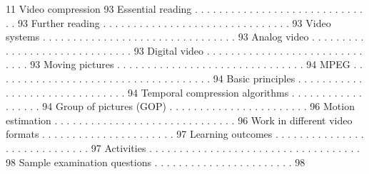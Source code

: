 11 Video compression 93
Essential reading . . . . . . . . . . . . . . . . . . . . . . . . . . . . . . 93
Further reading . . . . . . . . . . . . . . . . . . . . . . . . . . . . . . . 93
Video systems . . . . . . . . . . . . . . . . . . . . . . . . . . . . . . . . 93
Analog video . . . . . . . . . . . . . . . . . . . . . . . . . . . . . . 93
Digital video . . . . . . . . . . . . . . . . . . . . . . . . . . . . . . 93
Moving pictures . . . . . . . . . . . . . . . . . . . . . . . . . . . . . . . 94
MPEG . . . . . . . . . . . . . . . . . . . . . . . . . . . . . . . . . . . . 94
Basic principles . . . . . . . . . . . . . . . . . . . . . . . . . . . . . . . 94
Temporal compression algorithms . . . . . . . . . . . . . . . . . . 94
Group of pictures (GOP) . . . . . . . . . . . . . . . . . . . . . . . 96
Motion estimation . . . . . . . . . . . . . . . . . . . . . . . . . . . . . . 96
Work in different video formats . . . . . . . . . . . . . . . . . . . . . . 97
Learning outcomes . . . . . . . . . . . . . . . . . . . . . . . . . . . . . 97
Activities . . . . . . . . . . . . . . . . . . . . . . . . . . . . . . . . . . . 98
Sample examination questions . . . . . . . . . . . . . . . . . . . . . . . 98
